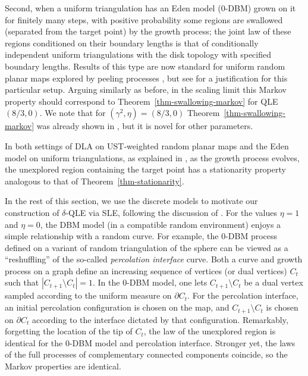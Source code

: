 \documentclass[a4paper]{article}
\numberwithin{equation}{section}
\theoremstyle{remark}
\numberwithin{equation}{section}
\begin{document}
Second, when a uniform triangulation has an Eden model ($0$-DBM) grown on it for finitely many steps, with positive probability some regions are swallowed (separated from the target point) by the growth process; the joint law of these regions conditioned on their boundary lengths is that of conditionally independent uniform triangulations with the disk topology with specified boundary lengths. Results of this type are now standard for uniform random planar maps explored by peeling processes \cite{as-uipt, curien-legall-peeling}, but see
\cite[Proposition 2.2 (iii) and Figure 2.2]{ms-qle} for a justification for this particular setup. Arguing similarly as before, in the scaling limit this Markov property should correspond to Theorem~\ref{thm-swallowing-markov} for QLE$(8/3,0)$. We note that for $(\gamma^2, \eta) = (8/3,0)$ Theorem~\ref{thm-swallowing-markov}  was already shown in \cite{ms-equivalence}, but it is novel for other parameters.


In both settings of DLA on UST-weighted random planar maps and the Eden model on uniform triangulations, as explained in \cite[Proposition 2.3 (ii) and Proposition 2.2 (i)]{ms-qle}, as the growth process evolves, the unexplored region containing the target point has a stationarity property analogous to that of Theorem~\ref{thm-stationarity}.

In the rest of this section, we use the discrete models to motivate our construction of $\delta$-QLE via SLE, following the discussion of \cite[Section 2]{ms-qle}. 
For the values $\eta = 1$ and $\eta = 0$, the DBM model (in a compatible random environment) enjoys a simple relationship with a random curve. For example, the $0$-DBM process defined on a variant of random triangulation of the sphere can be viewed as a ``reshuffling'' of the so-called \textit{percolation interface} curve. Both a curve and growth process on a graph define an increasing sequence of vertices (or dual vertices) $C_t$ such that $|C_{t + 1} \setminus C_t| = 1$. In the $0$-DBM model, one lets $C_{t + 1} \setminus C_t$ be a dual vertex sampled according to the uniform measure on $\partial C_t$. For the percolation interface, an initial percolation configuration is chosen on the map, and $C_{t + 1} \setminus C_t$ is chosen on $\partial C_t$ according to the interface dictated by that configuration. Remarkably, forgetting the location of the tip of $C_t$, the law of the unexplored region is identical for the $0$-DBM model and percolation interface. Stronger yet, the laws of the full processes of complementary connected components coincide, so the Markov properties are identical. 
\end{document}
